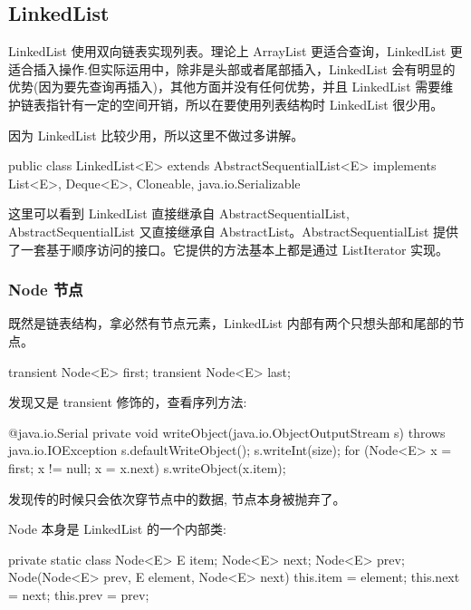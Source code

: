 \subsection{LinkedList}

LinkedList 使用双向链表实现列表。理论上 ArrayList 更适合查询，LinkedList 更适合插入操作.但实际运用中，除非是头部或者尾部插入，LinkedList 会有明显的优势(因为要先查询再插入)，其他方面并没有任何优势，并且 LinkedList 需要维护链表指针有一定的空间开销，所以在要使用列表结构时 LinkedList 很少用。

因为 LinkedList 比较少用，所以这里不做过多讲解。

\begin{Java}
public class LinkedList<E> extends AbstractSequentialList<E> implements List<E>, Deque<E>, Cloneable, java.io.Serializable
\end{Java}

这里可以看到 LinkedList 直接继承自 AbstractSequentialList, AbstractSequentialList 又直接继承自 AbstractList。AbstractSequentialList 提供了一套基于顺序访问的接口。它提供的方法基本上都是通过 ListIterator 实现。

\subsubsection{Node 节点}

既然是链表结构，拿必然有节点元素，LinkedList 内部有两个只想头部和尾部的节点。

\begin{Java}
transient Node<E> first;
transient Node<E> last;
\end{Java}

发现又是 transient 修饰的，查看序列方法:

\begin{Java}
@java.io.Serial
private void writeObject(java.io.ObjectOutputStream s)
    throws java.io.IOException {
    s.defaultWriteObject();
    s.writeInt(size);
    for (Node<E> x = first; x != null; x = x.next)
        s.writeObject(x.item);
}
\end{Java}

发现传的时候只会依次穿节点中的数据, 节点本身被抛弃了。

Node 本身是 LinkedList 的一个内部类:

\begin{Java}
private static class Node<E> {
    E item;
    Node<E> next;
    Node<E> prev;
    Node(Node<E> prev, E element, Node<E> next) {
        this.item = element;
        this.next = next;
        this.prev = prev;
    }
}
\end{Java}

